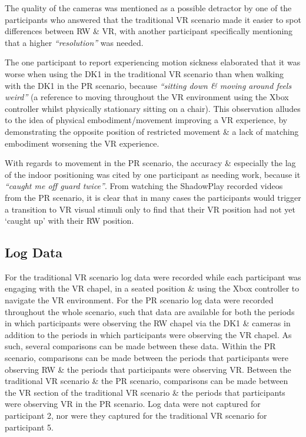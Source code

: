 The quality of the cameras was mentioned as a possible detractor by one of the participants who answered that the traditional VR scenario made it easier to spot differences between RW \& VR, with another participant specifically mentioning that a higher \textit{``resolution''} was needed.

The one participant to report experiencing motion sickness elaborated that it was worse when using the DK1 in the traditional VR scenario than when walking with the DK1 in the PR scenario, because \textit{``sitting down \& moving around feels weird''} (a reference to moving throughout the VR environment using the Xbox controller whilst physically stationary sitting on a chair). This observation alludes to the idea of physical embodiment/movement improving a VR experience, by demonstrating the opposite position of restricted movement \& a lack of matching embodiment worsening the VR experience.

With regards to movement in the PR scenario, the accuracy \& especially the lag of the indoor positioning was cited by one participant as needing work, because it \textit{``caught me off guard twice''}. From watching the ShadowPlay recorded videos from the PR scenario, it is clear that in many cases the participants would trigger a transition to VR visual stimuli only to find that their VR position had not yet `caught up' with their RW position.


\subsection{Log Data}

For the traditional VR scenario log data were recorded while each participant was engaging with the VR chapel, in a seated position \& using the Xbox controller to navigate the VR environment. For the PR scenario log data were recorded throughout the whole scenario, such that data are available for both the periods in which participants were observing the RW chapel via the DK1 \& cameras in addition to the periods in which participants were observing the VR chapel. As such, several comparisons can be made between these data. Within the PR scenario, comparisons can be made between the periods that participants were observing RW \& the periods that participants were observing VR. Between the traditional VR scenario \& the PR scenario, comparisons can be made between the VR section of the traditional VR scenario \& the periods that participants were observing VR in the PR scenario. Log data were not captured for participant 2, nor were they captured for the traditional VR scenario for participant 5.

